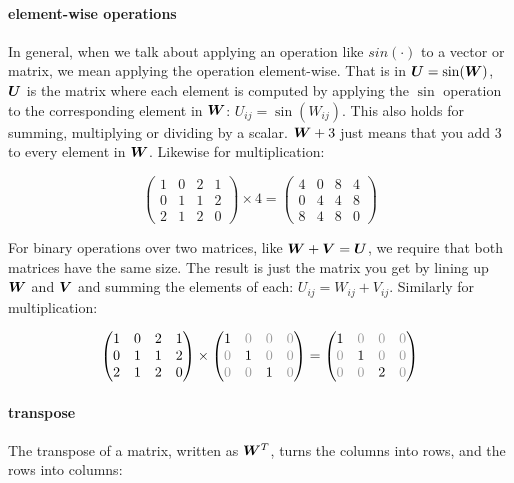 \documentclass[11pt]{article}
\begin{document}
\paragraph{element-wise operations} In general, when we talk about applying an operation like $sin(\cdot)$ to a vector or matrix, we mean applying the operation element-wise. That is in ${\bm U} = \sin({\bm W})$, ${\bm U}$ is the matrix where each element is computed by applying the $\sin$ operation to the corresponding element in ${\bm W}$: $U_{ij} = \sin\left(W_{ij}\right)$. This also holds for summing, multiplying or dividing by a scalar. ${\bm W} +  3$ just means that you add 3 to every element in ${\bm W}$. Likewise for multiplication:

\[
\begin{pmatrix}1 & 0 & 2 & 1 \\ 0 & 1 & 1  & 2\\ 2 & 1 & 2 & 0\end{pmatrix} \times 4 = \begin{pmatrix}4 & 0 & 8 & 4 \\ 0 & 4 & 4  & 8\\ 8 & 4 & 8 & 0\end{pmatrix}
\] 
 
\noindent For binary operations over two matrices, like ${\bm W} + {\bm V} = {\bm U}$, we require that both matrices have the same size. The result is just the matrix you get by lining up ${\bm W}$ and ${\bm V}$ and summing the elements of each: $U_{ij} = W_{ij} + V_{ij}$. Similarly for multiplication:

\[
\begin{pmatrix}1 & 0 & 2 & 1 \\ 0 & 1 & 1  & 2\\ 2 & 1 & 2 & 0\end{pmatrix} \times \begin{pmatrix}1 & \kc{0} & \kc{0} & \kc{0} \\ \kc{0} & 1 & \kc{0} & \kc{0}\\ \kc{0} & \kc{0} & 1 & \kc{0}\end{pmatrix} = \begin{pmatrix}1 & \kc{0} & \kc{0} & \kc{0} \\ \kc{0} & 1 & \kc{0}  & \kc{0}\\ \kc{0} & \kc{0} & 2 & \kc{0}\end{pmatrix}\] 

\paragraph{transpose} The transpose of a matrix, written as ${\bm W} ^T$, turns the columns into rows, and the rows into columns:
\end{document}
